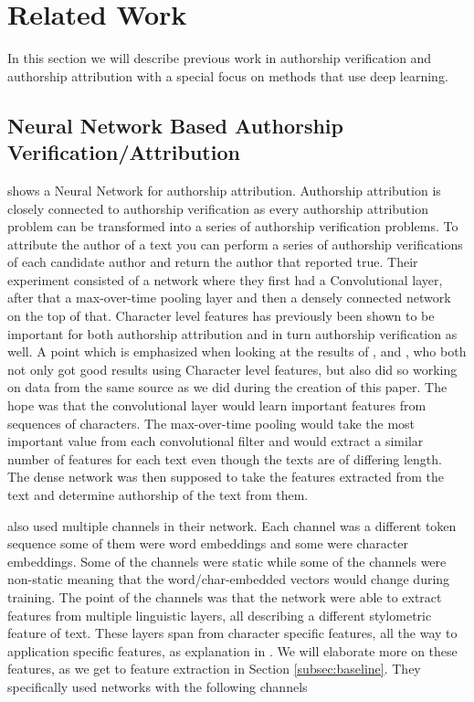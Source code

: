 \section{Related Work} \label{sec:related_work}

In this section we will describe previous work in authorship verification and
authorship attribution with a special focus on methods that use deep learning.


\subsection{Neural Network Based Authorship Verification/Attribution}

\cite{DBLP:journals/corr/RuderGB16c} shows a Neural Network for authorship
attribution. Authorship attribution is closely connected to authorship
verification as every authorship attribution problem can be transformed into a
series of authorship verification problems. To attribute the author of a text
you can perform a series of authorship verifications of each candidate author
and return the author that reported true. Their experiment consisted of a
network where they first had a Convolutional layer, after that a max-over-time
pooling layer and then a densely connected network on the top of that.
Character level features has previously been shown to be important for both
authorship attribution and in turn authorship verification as well. A point
which is emphasized when looking at the results of \cite{hansen2014}, and
\cite{aalykke2016}, who both not only got good results using Character level
features, but also did so working on data from the same source as we did during
the creation of this paper. The hope was that the convolutional layer would
learn important features from sequences of characters. The max-over-time pooling
would take the most important value from each convolutional filter and would
extract a similar number of features for each text even though the texts are
of differing length. The dense network was then supposed to take the features
extracted from the text and determine authorship of the text from them.

\cite{DBLP:journals/corr/RuderGB16c} also used multiple channels in their
network. Each channel was a different token sequence some of them were word
embeddings and some were character embeddings. Some of the channels were static
while some of the channels were non-static meaning that the word/char-embedded
vectors would change during training. The point of the channels was that the
network were able to extract features from multiple linguistic layers, all
describing a different stylometric feature of text. These layers span from
character specific features, all the way to application specific features, as
explanation in \cite[Section 2]{stamatos2009}. We will elaborate more on these
features, as we get to feature extraction in Section \ref{subsec:baseline}.
They specifically used networks with the following channels

